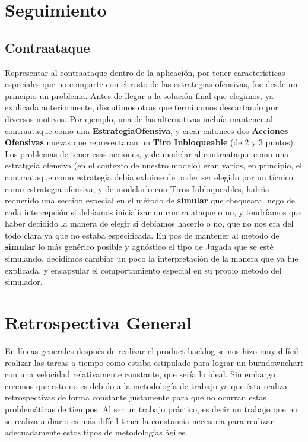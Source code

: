 \section{Seguimiento}

\subsection{Contraataque}

Representar al contraataque dentro de la aplicación, por tener características especiales que no comparte con el resto de las estrategias ofensivas, fue desde un principio un problema. Antes de llegar a la solución final que elegimos, ya explicada anteriormente, discutimos otras que terminamos descartando por diversos motivos. Por ejemplo, una de las alternativas incluía mantener al contraataque como una \textbf{EstrategiaOfensiva}, y crear entonces dos \textbf{Acciones Ofensivas} nuevas que representaran un \textbf{Tiro Inbloqueable} (de 2 y 3 puntos). Los problemas de tener esas acciones, y de modelar al contraataque como una estratgeia ofensiva (en el contexto de nuestro modelo) eran varios, en principio, el contraataque como estrategia debía exluirse de poder ser elegido por un tícnico como estrategia ofensiva, y de modelarlo con Tiros Inbloqueables, habría requerido una seccion especial en el método de \textbf{simular} que chequeara luego de cada intercepción si debíamos inicializar un contra ataque o no, y tendríamos que haber decidido la manera de elegir si debíamos hacerlo o no, que no nos era del todo clara ya que no estaba especificada. En pos de mantener al método de \textbf{simular} lo más genérico posible y agnóstico el tipo de Jugada que se esté simulando, decidimos cambiar un poco la interpretación de la manera que ya fue explicada, y encapsular el comportamiento especial en su propio método del simulador.

\section{Retrospectiva General}
En líneas generales después de realizar el product backlog se nos hizo muy difícil
realizar las tareas a tiempo como estaba estipulado para lograr un burndownchart
con una velocidad relativamente constante, que sería lo ideal. 
Sin embargo creemos que esto no es debido a la metodología de trabajo ya que 
ésta realiza retrospectivas de forma constante justamente para que 
no ocurran estas problemáticas de tiempos.
Al ser un trabajo práctico, es decir un trabajo que no se realiza a diario 
es más difícil tener la constancia necesaria
para realizar adecuadamente estos tipos de metodologías ágiles.

